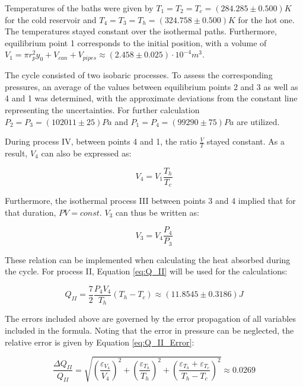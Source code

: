 Temperatures of the baths were given by $\mathit{T_1 = T_2 = T_c = (284.285 \pm 0.500) K}$ for the cold reservoir and $\mathit{T_4 = T_3 = T_h = (324.758 \pm 0.500) K} $ for the hot one. The temperatures stayed constant over the isothermal paths. Furthermore, equilibrium point 1 corresponds to the initial position, with a volume of $\mathit{V_1 = \pi r_p^2 y_0 + V_{can} + V_{pipes} \approx (2.458 \pm 0.025) \cdot 10^{-4} m^3}$. 


The cycle consisted of two isobaric processes. To assess the corresponding pressures, an average of the values between equilibrium points 2 and 3 as well as 4 and 1 was determined, with the approximate deviations from the constant line representing the uncertainties. For further calculation $\mathit{P_2 = P_3 = (102011 \pm 25) Pa}$ and $\mathit{P_1 = P_4 = (99290 \pm 75) Pa}$ are utilized.

During process IV, between points 4 and 1, the ratio $\mathit{\frac{V}{T}}$ stayed constant. As a result, $\mathit{V_4}$ can also be expressed as:

\begin{equation}
\label{eq:V_4}
    \mathit{V_4 = V_1 \frac{T_h}{T_c}}
\end{equation}

Furthermore, the isothermal process III between points 3 and 4 implied that for that duration, $\mathit{PV = const}$. $\mathit{V_3}$ can thus be written as:

\begin{equation}
\label{eq:V_3}
    \mathit{V_3 = V_4 \frac{P_4}{P_3}}
\end{equation}

These relation can be implemented when calculating the heat absorbed during the cycle. For process II, Equation \ref{eq:Q_II} will be used for the calculations:

\begin{equation}
\label{eq:V_T const}
    \mathit{Q_{II} = \frac{7}{2} \frac{P_4 V_4}{T_h}(T_h - T_c) \approx (11.8545 \pm 0.3186) J}
\end{equation}

The errors included above are governed by the error propagation of all variables included in the formula. Noting that the error in pressure can be neglected, the relative error is given by Equation \ref{eq:Q_II_Error}:

\begin{equation}
    \label{eq:Q_II_Error}
    \mathit{\frac{\Delta Q_{II}}{Q_{II}} = \sqrt{(\frac{\varepsilon_{V_4}}{V_4})^2 + (\frac{\varepsilon_{T_h}}{T_h})^2 + (\frac{\varepsilon_{T_h} + \varepsilon_{T_c}}{T_h -T_c})^2} \approx 0.0269}
\end{equation} 

